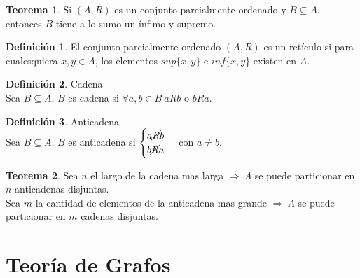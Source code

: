 \documentclass[10pt]{article}
\theoremstyle{definition}
\newtheorem{definition}{Definición}[section]
\newtheorem{theorem}{Teorema}[section]
\begin{document}
    \begin{theorem}
        Si $(A,R)$ es un conjunto parcialmente ordenado y $B\subseteq A$, entonces $B$ tiene a lo sumo un ínfimo y supremo.
    \end{theorem}
    \begin{definition}
        El conjunto parcialmente ordenado $(A,R)$ es un retículo si para cualesquiera $x,y\in A$, los elementos $sup\{x,y\}$ e $inf\{x,y\}$ existen en $A$.
    \end{definition}
    \begin{definition}{Cadena}
        \\Sea $B\subseteq A$, $B$ es cadena si $\forall a,b\in B\ aRb$ o $bRa$.
    \end{definition}
    \begin{definition}{Anticadena}
        \\Sea $B\subseteq A$, $B$ es anticadena si $\begin{cases} a\cancel{R}b\\b\cancel{R}a\end{cases}$ con $a\neq b$.
    \end{definition}
    \begin{theorem}
        Sea $n$ el largo de la cadena mas larga $\Rightarrow\ A$ se puede particionar en $n$ anticadenas disjuntas.\\
        Sea $m$ la cantidad de elementos de la anticadena mas grande $\Rightarrow\ A$ se puede particionar en $m$ cadenas disjuntas.
    \end{theorem}
    \newpage\section{Teoría de Grafos}
\end{document}
